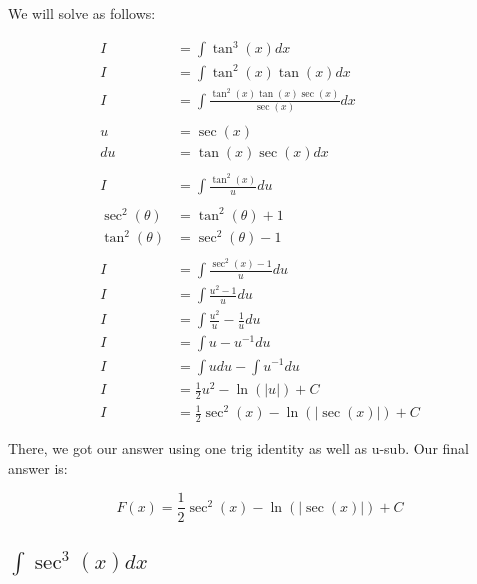 \documentclass[12pt]{article}
\begin{document}
We will solve as follows:


\begin{align}
    I              & = \int \tan^3(x) dx                               \\
    I              & = \int \tan^2(x)\tan(x) dx                        \\
    I              & = \int \frac{\tan^2(x)\tan(x)\sec(x)}{\sec(x)} dx \\
    \nonumber                                                          \\
    u              & = \sec(x)                                         \\
    du             & = \tan(x)\sec(x) dx                               \\
    \nonumber                                                          \\
    I              & = \int \frac{\tan^2(x)}{u} du                     \\
    \nonumber                                                          \\
    \sec^2(\theta) & = \tan^2(\theta) + 1                              \\
    \tan^2(\theta) & = \sec^2(\theta) - 1                              \\
    \nonumber                                                          \\
    I              & = \int \frac{\sec^2(x) - 1}{u} du                 \\
    I              & = \int \frac{u^2 - 1}{u} du                       \\
    I              & = \int \frac{u^2}{u} - \frac{1}{u} du             \\
    I              & = \int u - u^{-1} du                              \\
    I              & = \int u du - \int u^{-1} du                      \\
    I              & = \frac{1}{2}u^2 - \ln(|u|) + C                   \\
    I              & = \frac{1}{2}\sec^2(x) - \ln(|\sec(x)|) + C
\end{align}


There, we got our answer using one trig identity as well as u-sub. Our final answer is:

$$
    F(x) = \frac{1}{2}\sec^2(x) - \ln(|\sec(x)|) + C
$$

\subsection{$\int \sec^3(x) dx$}
\end{document}
